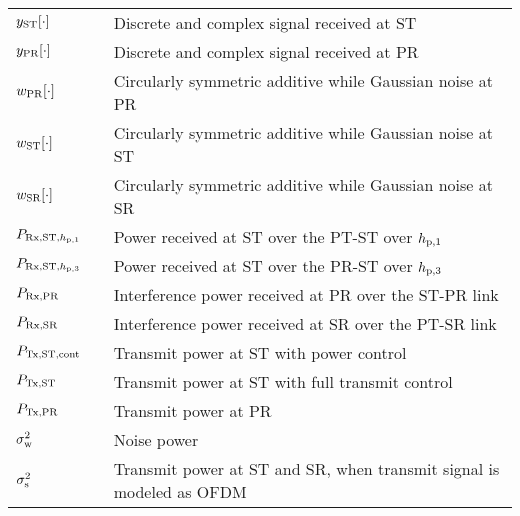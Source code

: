 \begin{longtable}{p{}p{}p{}}
	$y_{\text{ST}}[\cdot]$       & &             Discrete and complex signal received at ST \\	
	

	$y_{\text{PR}}[\cdot]$       & &             Discrete and complex signal received at PR \\	
	$w_{\text{PR}}[\cdot]$       & &             Circularly symmetric additive while Gaussian noise at PR \\	
	$w_{\text{ST}}[\cdot]$       & &             Circularly symmetric additive while Gaussian noise at ST \\	
	$w_{\text{SR}}[\cdot]$       & &             Circularly symmetric additive while Gaussian noise at SR \\	
	$P_{\text{Rx,ST,$h_{\text{p,1}}$}}$  		& &		Power received at ST over the PT-ST over $h_{\text{p,1}}$ \\ 
	$P_{\text{Rx,ST,$h_{\text{p,3}}$}}$  		& &		Power received at ST over the PR-ST over $h_{\text{p,3}}$ \\ 
	$P_{\text{Rx,PR}}$  		& &		Interference power received at PR over the ST-PR link \\
	$P_{\text{Rx,SR}}$  		& &		Interference power received at SR over the PT-SR link\\ 

	$P_{\text{Tx,ST,cont}}$	  		& &  	Transmit power at ST with power control \\
	$P_{\text{Tx,ST}}$ 		& &  	Transmit power at ST with full transmit control \\
	$P_{\text{Tx,PR}}$  		& &		Transmit power at PR \\

	$\sigma^2_{\text{w}}$	 		& & 	Noise power \\
	$\sigma^2_{\text{s}}$	 		& &  Transmit power at ST and SR, when transmit signal is modeled as OFDM  \\


\end{longtable}
